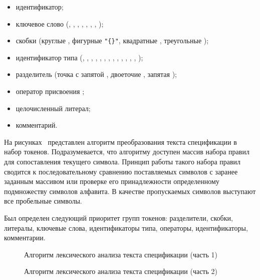 \begin{itemize}
    \item идентификатор;
    \item ключевое слово (, , ,
          , , ,
          , );
    \item скобки (круглые , фигурные \verb+"{}"+,
          квадратные , треугольные );
    \item идентификатор типа (, ,
          , , , ,
          , , ,
          , , , ,
          );
    \item разделитель (точка с запятой , двоеточие ,
          запятая );
    \item оператор присвоения ;
    \item целочисленный литерал;
    \item комментарий.
\end{itemize}

На рисунках~ представлен алгоритм
преобразования текста спецификации в набор токенов. Подразумевается, что
алгоритму доступен массив набора правил для сопоставления текущего символа.
Принцип работы такого набора правил сводится к последовательному сравнению
поставляемых символов с заранее заданным массивом или проверке его
принадлежности определенному подмножеству символов алфавита. В качестве
пропускаемых символов выступают все пробельные символы.

Был определен следующий приоритет групп токенов: разделители, скобки, литералы,
ключевые слова, идентификаторы типа, операторы, идентификаторы, комментарии.

\clearpage

\vspace*{\fill}
\begin{figure}[!h]
    \centering
    \def\svgwidth{\textwidth}
    
    \caption{Алгоритм лексического анализа текста спецификации (часть 1)}
    \label{fig:lexer_alg1}
\end{figure}
\vspace{\fill}
\clearpage

\vspace*{\fill}
\begin{figure}[!h]
    \centering
    \def\svgwidth{0.7\textwidth}
    
    \caption{Алгоритм лексического анализа текста спецификации (часть 2)}
    \label{fig:lexer_alg2}
\end{figure}
\vspace{\fill}
\clearpage

